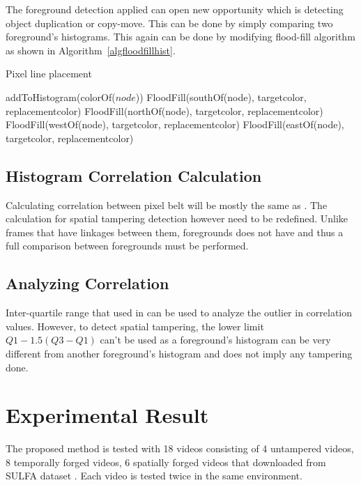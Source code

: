 \documentclass[conference]{IEEEtran}
\begin{document}
The foreground detection applied can open new opportunity which is detecting object duplication or copy-move. This can be done by simply comparing two foreground's histograms. This again can be done by modifying flood-fill algorithm as shown in Algorithm~\ref{algfloodfillhist}.

\begin{algorithm}
\caption{Pixel line placement}\label{algfloodfillhist}
\begin{algorithmic}[1]
  \Return
\EndIf
\State addToHistogram(colorOf($node$))
\State FloodFill(southOf(node), targetcolor, replacementcolor)
\State FloodFill(northOf(node), targetcolor, replacementcolor)
\State FloodFill(westOf(node), targetcolor, replacementcolor)
\State FloodFill(eastOf(node), targetcolor, replacementcolor)
\EndProcedure
\end{algorithmic}
\end{algorithm}

\subsection{Histogram Correlation Calculation}
Calculating correlation between pixel belt will be mostly the same as \cite{b2}. The calculation for spatial tampering detection however need to be redefined. Unlike frames that have linkages between them, foregrounds does not have and thus a full comparison between foregrounds must be performed.

\subsection{Analyzing Correlation}
Inter-quartile range that used in \cite{b2} can be used to analyze the outlier in correlation values. However, to detect spatial tampering, the lower limit $Q1-1.5(Q3-Q1)$ can't be used as a foreground's histogram can be very different from another foreground's histogram and does not imply any tampering done.

\section{Experimental Result}
The proposed method is tested with 18 videos consisting of 4 untampered videos, 8 temporally forged videos, 6 spatially forged videos that downloaded from SULFA dataset \cite{sulfa}. Each video is tested twice in the same environment.
\end{document}
